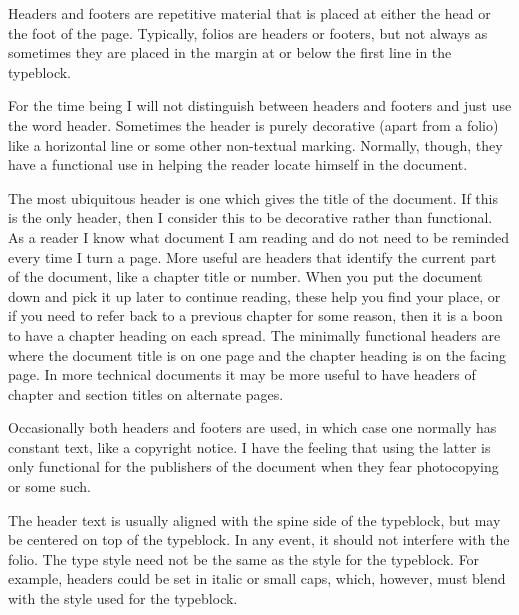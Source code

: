 \documentclass[10pt,a4paper,oneside,extrafontsizes]{memoir}%
\begin{document}
\begin{paracol}{2}
\switchEng
    Headers and footers are repetitive material that is placed at either 
the head or the foot of the page. Typically, folios are headers 
or footers, but not always as sometimes they are placed in the 
margin at or below the first line in the 
typeblock.

   For the time being I will not distinguish between headers and footers and 
just use the word header. Sometimes the header is purely decorative (apart
from a folio) like a horizontal line or some other non-textual 
marking. Normally, though, they have a functional use in helping the 
reader locate himself in the document.

    The most ubiquitous header is one which gives the title of the document.
If this is the only header, then I consider this to be decorative rather
than functional. As a reader I know what document I am reading and do not
need to be reminded every time I turn a page. More useful are headers that
identify the current part of the document, like a chapter 
title or number.
When you put the document down and pick it up later to continue reading, these
help you find your place, or if you need to refer back to a previous chapter
for some reason, then it is a boon to have a chapter heading 
on each 
spread. The minimally functional headers are where the document title
is on one page and the chapter heading is on the facing page. In more technical
documents it may be more useful to have headers of chapter and section titles
on alternate pages. 

    Occasionally both headers and footers are used, in which case one normally
has constant text, like a copyright notice. 
I have the feeling that using the latter is only functional for the 
publishers of the document when they fear photocopying or some such.

    The header text is usually aligned with the spine side 
of the typeblock, but may be centered on top of the 
typeblock. In any event, it should not interfere with 
the folio. The type style need not be the same as the style 
for the typeblock. For example, headers could be set in italic
or small caps, which, however, must blend with the style used for the 
typeblock.
\end{paracol}
\end{document}
